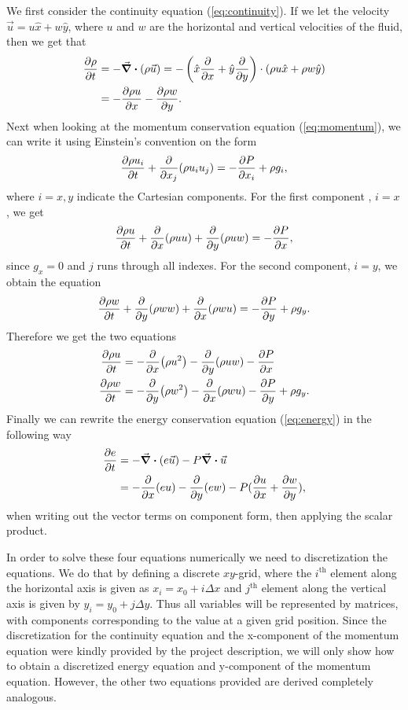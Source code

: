 \documentclass{emulateapj}
\begin{document}
	We first consider the continuity equation (\ref{eq:continuity}). If we let the velocity $\vec{u} = u\hat{x} + w\hat{y}$, where $u$ and $w$ are the horizontal and vertical velocities of the fluid, then we get that
	\begin{align}
		\pdv{\rho}{t} &= - \div{(\rho \vec{u})} = - \left(\hat{x}\pdv{x} + \hat{y}\pdv{y}\right)\cdot \left(\rho u \hat{x} + \rho w \hat{y}\right)\\
		 &= - \pdv{\rho u}{x} - \pdv{\rho w}{y}.
	\end{align}
	Next when looking at the momentum conservation equation (\ref{eq:momentum}), we can write it using Einstein's convention on the form 
	\begin{align}
		\pdv{\rho u_i}{t} + \pdv{x_j}(\rho u_i u_j) = -\pdv{P}{x_i} + \rho g_i, 
	\end{align}
	where $i = x, y$ indicate the Cartesian components. For the first component , $i = x$, we get
	\begin{align}
		\pdv{\rho u}{t} + \pdv{x}(\rho u u) + \pdv{y}(\rho u w) = -\pdv{P}{x},
	\end{align}
	since $g_x = 0$ and $j$ runs through all indexes. For the second component, $i = y$, we obtain the equation 
	\begin{align}
		\pdv{\rho w}{t} + \pdv{y}(\rho w w) + \pdv{x}(\rho w u) = -\pdv{P}{y} + \rho g_y.
	\end{align}
	Therefore we get the two equations 
	\begin{align}
		\pdv{\rho u}{t} &= - \pdv{x}(\rho u^2) - \pdv{y}(\rho u w) -\pdv{P}{x}\\
		\pdv{\rho w}{t} &= - \pdv{y}(\rho w^2) - \pdv{x}(\rho w u) -\pdv{P}{y} + \rho g_y.
	\end{align}
	Finally we can rewrite the energy conservation equation (\ref{eq:energy}) in the following way
	\begin{align}
		\pdv{e}{t} &= -\div{(e \vec{u})} -P\div{\vec{u}} \\
		&= -\pdv{x}(eu) - \pdv{y}(ew) - P(\pdv{u}{x} + \pdv{w}{y}),
	\end{align}
	when writing out the vector terms on component form, then applying the scalar product.
	
	In order to solve these four equations numerically we need to discretization the equations. We do that by defining a discrete $xy$-grid, where the $i^\text{th}$ element along the horizontal axis is given as $x_i = x_0 + i\Delta x$ and $j^\text{th}$ element along the vertical axis is given by $y_i = y_0 + j\Delta y$. Thus all variables will be represented by matrices, with components corresponding to the value at a given grid position. Since the discretization for the continuity equation and the x-component of the momentum equation were kindly provided by the project description, we will only show how to obtain a discretized energy equation and y-component of the momentum equation. However, the other two equations provided are derived completely analogous. 
	
\end{document}
